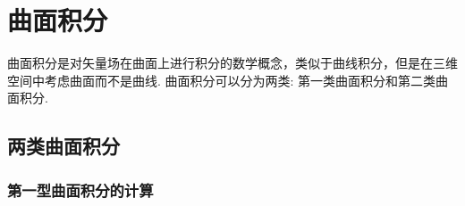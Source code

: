 \section{曲面积分}

曲面积分是对矢量场在曲面上进行积分的数学概念，类似于曲线积分，但是在三维空间中考虑曲面而不是曲线. 曲面积分可以分为两类: 第一类曲面积分和第二类曲面积分.

\subsection{两类曲面积分}

\subsubsection{第一型曲面积分的计算}

